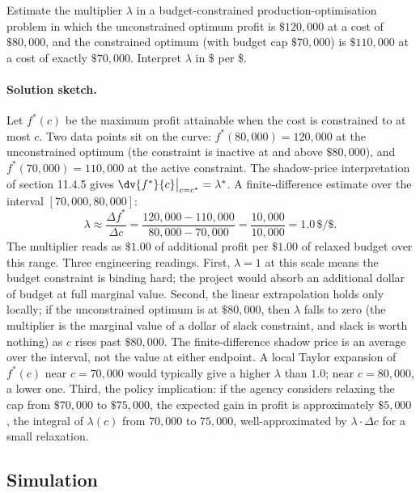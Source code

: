 \begin{exercise}
Estimate the multiplier $\lambda$ in a budget-constrained
production-optimisation problem in which the unconstrained optimum
profit is $\$120{,}000$ at a cost of $\$80{,}000$, and the
constrained optimum (with budget cap $\$70{,}000$) is $\$110{,}000$
at a cost of exactly $\$70{,}000$. Interpret $\lambda$ in
\$ per \$.

\paragraph{Solution sketch.} Let $f^{*}(c)$ be the maximum profit
attainable when the cost is constrained to at most $c$. Two data
points sit on the curve: $f^{*}(80{,}000) = 120{,}000$ at the
unconstrained optimum (the constraint is inactive at and above
$\$80{,}000$), and $f^{*}(70{,}000) = 110{,}000$ at the active
constraint. The shadow-price interpretation of section 11.4.5 gives
$\dv{f^{*}}{c}\big|_{c = c^{*}} = \lambda^{*}$. A finite-difference
estimate over the interval $[70{,}000, 80{,}000]$:
\[
\lambda \approx \frac{\Delta f^{*}}{\Delta c} =
\frac{120{,}000 - 110{,}000}{80{,}000 - 70{,}000} =
\frac{10{,}000}{10{,}000} = 1.0\,\$/\$.
\]
The multiplier reads as $\$1.00$ of additional profit per $\$1.00$
of relaxed budget over this range. Three engineering readings.
First, $\lambda = 1$ at this scale means the budget constraint is
binding hard; the project would absorb an additional dollar of
budget at full marginal value. Second, the linear extrapolation
holds only locally; if the unconstrained optimum is at $\$80{,}000$,
then $\lambda$ falls to zero (the multiplier is the marginal value
of a dollar of slack constraint, and slack is worth nothing) as
$c$ rises past $\$80{,}000$. The finite-difference shadow price is
an average over the interval, not the value at either endpoint. A
local Taylor expansion of $f^{*}(c)$ near $c = 70{,}000$ would
typically give a higher $\lambda$ than $1.0$; near $c = 80{,}000$,
a lower one. Third, the policy implication: if the agency considers
relaxing the cap from $\$70{,}000$ to $\$75{,}000$, the expected
gain in profit is approximately $\$5{,}000$, the integral of
$\lambda(c)$ from $70{,}000$ to $75{,}000$, well-approximated by
$\lambda \cdot \Delta c$ for a small relaxation.
\end{exercise}

\subsection*{Simulation}

